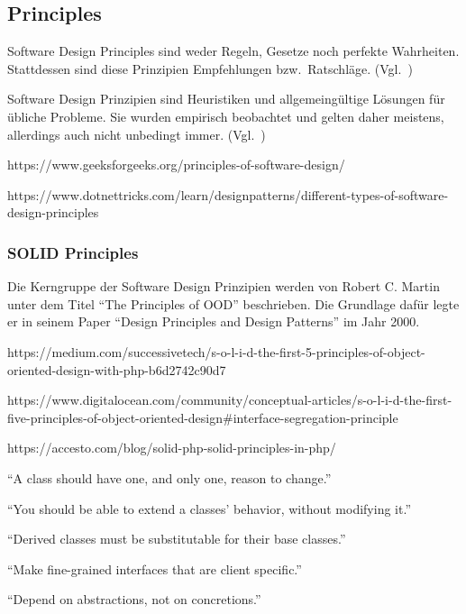 \subsection{Principles}
Software Design Principles sind weder Regeln, Gesetze noch perfekte Wahrheiten.
Stattdessen sind diese Prinzipien Empfehlungen bzw.\ Ratschläge.
(Vgl.~\cite{getting-a-solid-start})

Software Design Prinzipien sind Heuristiken und allgemeingültige Lösungen für übliche Probleme.
Sie wurden empirisch beobachtet und gelten daher meistens, allerdings auch nicht unbedingt immer.
(Vgl.~\cite{getting-a-solid-start})

https://www.geeksforgeeks.org/principles-of-software-design/

https://www.dotnettricks.com/learn/designpatterns/different-types-of-software-design-principles

\subsubsection{SOLID Principles}
Die Kerngruppe der Software Design Prinzipien werden von Robert C. Martin unter dem Titel \enquote{The Principles of OOD}\cite{solid} beschrieben.
Die Grundlage dafür legte er in seinem Paper \enquote{Design Principles and Design Patterns}\cite{design-principles-and-design-patterns} im Jahr 2000.

https://medium.com/successivetech/s-o-l-i-d-the-first-5-principles-of-object-oriented-design-with-php-b6d2742c90d7

https://www.digitalocean.com/community/conceptual-articles/s-o-l-i-d-the-first-five-principles-of-object-oriented-design#interface-segregation-principle

https://accesto.com/blog/solid-php-solid-principles-in-php/

\enquote{A class should have one, and only one, reason to change.}\cite{solid}

\enquote{You should be able to extend a classes' behavior, without modifying it.}\cite{solid}

\enquote{Derived classes must be substitutable for their base classes.}\cite{solid}

\enquote{Make fine-grained interfaces that are client specific.}\cite{solid}

\enquote{Depend on abstractions, not on concretions.}\cite{solid}


